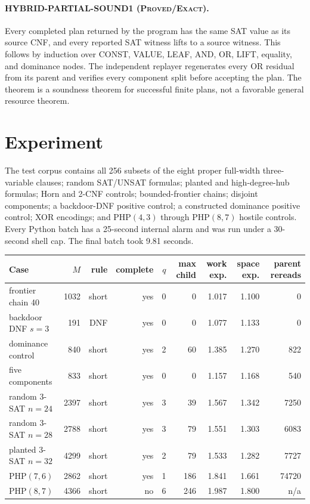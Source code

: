 \documentclass[11pt]{article}
\newcommand{\Exact}{\textnormal{\textsc{Proved/Exact}}}
\begin{document}
\paragraph{HYBRID-PARTIAL-SOUND1 (\Exact).}
Every completed plan returned by the program has the same SAT value as its
source CNF, and every reported SAT witness lifts to a source witness.
This follows by induction over CONST, VALUE, LEAF, AND, OR, LIFT, equality,
and dominance nodes.  The independent replayer regenerates every OR residual
from its parent and verifies every component split before accepting the plan.
The theorem is a soundness theorem for successful finite plans, not a
favorable general resource theorem.

\section{Experiment}

The test corpus contains all 256 subsets of the eight proper full-width
three-variable clauses; random SAT/UNSAT formulas; planted and high-degree-hub
formulas; Horn and 2-CNF controls; bounded-frontier chains; disjoint
components; a backdoor-DNF positive control; a constructed dominance
positive control; XOR encodings; and PHP$(4,3)$ through PHP$(8,7)$ hostile
controls.  Every Python batch has a 25-second internal alarm and was run under
a 30-second shell cap.  The final batch took 9.81 seconds.

\begin{center}
\scriptsize
\setlength{\tabcolsep}{3.2pt}
\begin{tabular}{lrrrrrrrr}
\toprule
Case & $M$ & rule & complete & $q$ & max child & work exp. & space exp. & parent rereads\\
\midrule
frontier chain 40 & 1032 & short & yes & 0 & 0 & 1.017 & 1.100 & 0\\
backdoor DNF $s=3$ & 191 & DNF & yes & 0 & 0 & 1.077 & 1.133 & 0\\
dominance control & 840 & short & yes & 2 & 60 & 1.385 & 1.270 & 822\\
five components & 833 & short & yes & 0 & 0 & 1.157 & 1.168 & 540\\
random 3-SAT $n=24$ & 2397 & short & yes & 3 & 39 & 1.567 & 1.342 & 7250\\
random 3-SAT $n=28$ & 2788 & short & yes & 3 & 79 & 1.551 & 1.303 & 6083\\
planted 3-SAT $n=32$ & 4299 & short & yes & 2 & 79 & 1.533 & 1.282 & 7727\\
PHP$(7,6)$ & 2862 & short & yes & 1 & 186 & 1.841 & 1.661 & 74720\\
PHP$(8,7)$ & 4366 & short & no & 6 & 246 & 1.987 & 1.800 & n/a\\
\bottomrule
\end{tabular}
\end{center}
\end{document}
